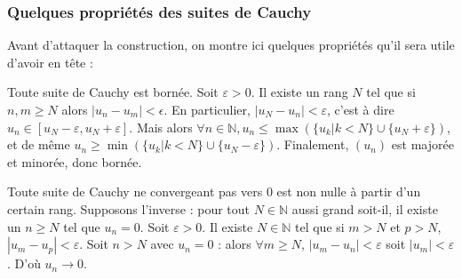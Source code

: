 \subsubsection{Quelques propriétés des suites de Cauchy}

Avant d'attaquer la construction, on montre ici quelques propriétés qu'il sera utile d'avoir en tête :

\begin{prop}
Toute suite de Cauchy est bornée.
\tcblower
Soit $\varepsilon>0$. Il existe un rang $N$ tel que si $n,m \geq N$ alors $|u_n-u_m|<\epsilon$. En particulier, $|u_N-u_n|<\varepsilon$, c'est à dire $u_n \in [u_N - \varepsilon, u_N + \varepsilon]$. Mais alors $\forall n \in \mathbb{N}, u_n \leq \max (\{ u_k | k < N\} \cup \{u_N+\varepsilon\})$, et de même $u_n \geq \min (\{ u_k | k < N\} \cup \{u_N-\varepsilon\})$. Finalement, $(u_n)$ est majorée et minorée, donc bornée.
\end{prop}

\begin{prop}
    Toute suite de Cauchy ne convergeant pas vers 0 est non nulle à partir d'un certain rang.
    \tcblower
    Supposons l'inverse : pour tout $N \in \mathbb{N}$ aussi grand soit-il, il existe un $n\geq N$ tel que $u_n=0$. Soit $\varepsilon >0$. Il existe $N \in \mathbb{N}$ tel que si $m>N$ et $p>N$, $|u_m-u_p|<\varepsilon$. Soit $n>N$ avec $u_n=0$ : alors $\forall m \geq N$, $|u_m-u_n|<\varepsilon$ soit $|u_m|<\varepsilon$. D'où $u_n \to 0$. 
\end{prop}

